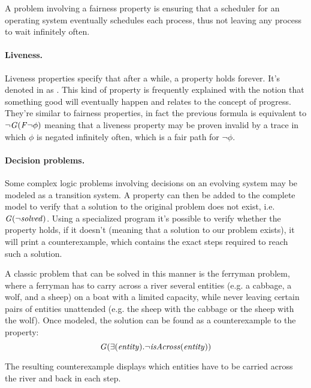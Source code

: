 A problem involving a fairness property is ensuring that a scheduler for an operating system eventually schedules each process, thus not leaving any process to wait infinitely often.

\paragraph*{Liveness.} Liveness properties specify that after a while, a property holds forever. It's denoted in \ltl{} as \flive{}.
This kind of property is frequently explained with the notion that something good will eventually happen and relates to the concept of progress.
They're similar to fairness properties, in fact the previous formula is equivalent to $\lnot \mathit{G}(\mathit{F} \lnot \phi)$ meaning that a liveness property may be proven invalid by a trace in which $\phi$ is negated infinitely often, which is a fair path for $\lnot \phi$.

\paragraph*{Decision problems.} Some complex logic problems involving decisions on an evolving system may be modeled as a transition system.
A property can then be added to the complete model to verify that a solution to the original problem does not exist, i.e. $\mathit{G} (\lnot \mathit{solved})$.
Using a specialized program it's possible to verify whether the property holds, if it doesn't (meaning that a solution to our problem exists), it will print a counterexample, which contains the exact steps required to reach such a solution.

A classic problem that can be solved in this manner is the ferryman problem, where a ferryman has to carry across a river several entities (e.g. a cabbage, a wolf, and a sheep) on a boat with a limited capacity, while never leaving certain pairs of entities unattended (e.g. the sheep with the cabbage or the sheep with the wolf).
Once modeled, the solution can be found as a counterexample to the property:
\[
    \mathit{G} (\exists (\mathit{entity}). \lnot \mathit{isAcross}(\mathit{entity}))
\]

The resulting counterexample displays which entities have to be carried across the river and back in each step.

